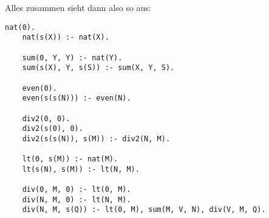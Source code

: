 \documentclass[ngerman, a4paper, 11pt]{article}
\theoremstyle{nonumberplain}
\begin{document}
\pagebreak

Alles zusammen sieht dann also so aus:

\begin{lstlisting}[style=frame]
	nat(0).
	nat(s(X)) :- nat(X).
	
	sum(0, Y, Y) :- nat(Y).
	sum(s(X), Y, s(S)) :- sum(X, Y, S).
	
	even(0).
	even(s(s(N))) :- even(N).
	
	div2(0, 0).
	div2(s(0), 0).
	div2(s(s(N)), s(M)) :- div2(N, M).
	
	lt(0, s(M)) :- nat(M).
	lt(s(N), s(M)) :- lt(N, M).
	
	div(0, M, 0) :- lt(0, M).
	div(N, M, 0) :- lt(N, M).
	div(N, M, s(Q)) :- lt(0, M), sum(M, V, N), div(V, M, Q).
\end{lstlisting}
\end{document}
